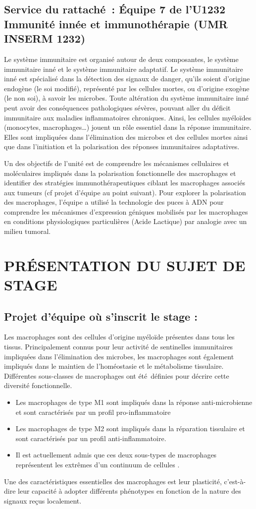 \documentclass[a4paper,10pt]{article}
\begin{document}
\subsection{Service du rattaché : Équipe 7 de l’U1232 Immunité innée et immunothérapie (UMR INSERM 1232)}
Le système immunitaire est organisé autour de deux composantes, le système immunitaire inné et le système immunitaire adaptatif. Le système immunitaire inné est spécialisé dans la détection des signaux de danger, qu’ils soient d’origine endogène (le soi modifié), représenté par les cellules mortes, ou d’origine exogène (le non soi), à savoir les microbes. 
Toute altération du système immunitaire inné peut avoir des conséquences pathologiques sévères, pouvant aller du déficit immunitaire aux maladies inflammatoires chroniques. Ainsi, les cellules myéloïdes (monocytes, macrophages…) jouent un rôle essentiel dans la réponse immunitaire. Elles sont impliquées dans l’élimination des microbes et des cellules mortes ainsi que dans l’initiation et la polarisation des réponses immunitaires adaptatives. 

Un des objectifs de l’unité est de comprendre les mécanismes cellulaires et moléculaires impliqués dans la polarisation fonctionnelle des macrophages et identifier des stratégies immunothérapeutiques ciblant les macrophages associés aux tumeurs (cf projet d’équipe au point suivant). 
Pour explorer la polarisation des macrophages, l’équipe a utilisé la technologie des puces à ADN pour comprendre les mécanismes d’expression géniques mobilisés par les macrophages en conditions physiologiques particulières (Acide Lactique) par analogie avec un milieu tumoral. 
\section{PR\'{E}SENTATION DU SUJET DE STAGE }
\subsection{Projet d’équipe où s’inscrit le stage :}
Les macrophages sont des cellules d’origine myéloïde présentes dans tous les tissus.
Principalement connus pour leur activité de sentinelles immunitaires impliquées dans l’élimination des microbes, les macrophages sont également impliqués dans le maintien de l’homéostasie et le métabolisme tissulaire. Différentes sous-classes de macrophages ont été définies pour décrire cette diversité fonctionnelle. 
\begin{itemize}
 \item Les macrophages de type M1 sont impliqués dans la réponse anti-microbienne et sont caractérisés par un profil pro-inflammatoire 
\item Les macrophages de type M2 sont impliqués dans la réparation tissulaire et sont caractérisés par un profil anti-inflammatoire. 
\item Il est actuellement admis que ces deux sous-types de macrophages représentent les extrêmes d’un continuum de cellules \cite{sica2012macrophage}.
\end{itemize}
Une des caractéristiques essentielles des macrophages est leur plasticité, c’est-à-dire leur capacité à adopter différents phénotypes en fonction de la nature des signaux reçus localement.
 
\end{document}

